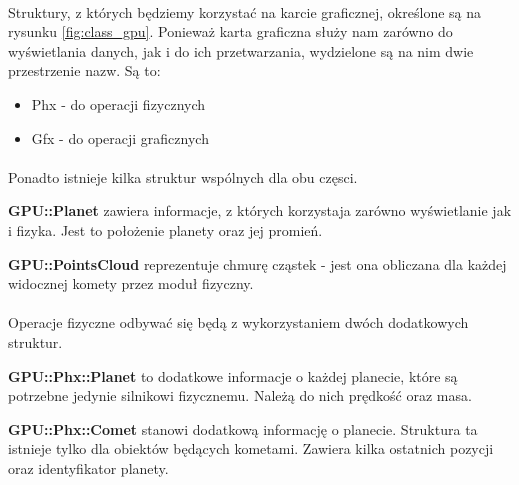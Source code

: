\paragraph{}
Struktury, z których będziemy korzystać na karcie graficznej, określone są na rysunku \ref{fig:class_gpu}. Ponieważ karta graficzna służy nam zarówno do wyświetlania danych, jak i do ich przetwarzania, wydzielone są na nim dwie przestrzenie nazw. Są to:
\begin{itemize}
	\item{Phx - do operacji fizycznych}
	\item{Gfx - do operacji graficznych}
\end{itemize}

\paragraph{}
Ponadto istnieje kilka struktur wspólnych dla obu częsci.

\begin{description}
\item{\bf GPU::Planet} zawiera informacje, z których korzystaja zarówno wyświetlanie jak i fizyka. Jest to położenie planety oraz jej promień.
\item{\bf GPU::PointsCloud} reprezentuje chmurę cząstek - jest ona obliczana dla każdej widocznej komety przez moduł fizyczny.
\end{description}

\paragraph{}

Operacje fizyczne odbywać się będą z wykorzystaniem dwóch dodatkowych struktur.

\begin{description}
\item{\bf GPU::Phx::Planet} to dodatkowe informacje o każdej planecie, które są potrzebne jedynie silnikowi fizycznemu. Należą do nich prędkość oraz masa.
\item{\bf GPU::Phx::Comet} stanowi dodatkową informację o planecie. Struktura ta istnieje tylko dla obiektów będących kometami. Zawiera kilka ostatnich pozycji oraz identyfikator planety.
\end{description}

\paragraph{}

